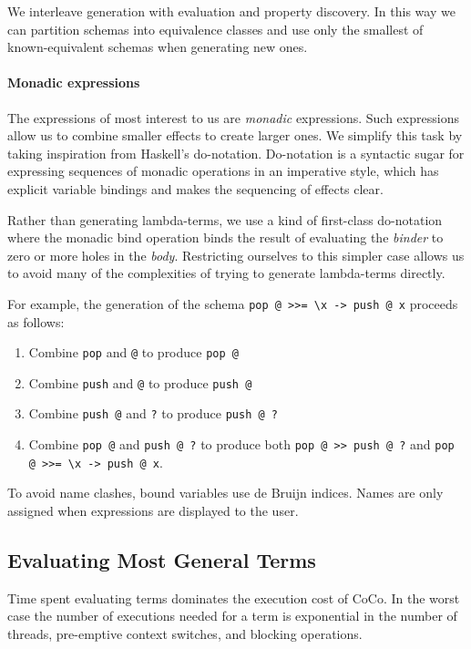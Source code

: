 We interleave generation with evaluation and property discovery.  In
this way we can partition schemas into equivalence classes and use
only the smallest of known-equivalent schemas when generating new
ones.

\paragraph{Monadic expressions}
The expressions of most interest to us are \emph{monadic} expressions.
Such expressions allow us to combine smaller effects to create larger
ones.  We simplify this task by taking inspiration from Haskell's
do-notation.  Do-notation is a syntactic sugar for expressing
sequences of monadic operations in an imperative style, which has
explicit variable bindings and makes the sequencing of effects clear.

Rather than generating lambda-terms, we use a kind of first-class
do-notation where the monadic bind operation binds the result of
evaluating the \emph{binder} to zero or more holes in the \emph{body}.
Restricting ourselves to this simpler case allows us to avoid many of
the complexities of trying to generate lambda-terms directly.

For example, the generation of the schema
\verb|pop @ >>= \x -> push @ x| proceeds as follows:

\begin{enumerate}
\item Combine \verb|pop| and \verb|@| to produce \verb|pop @|
\item Combine \verb|push| and \verb|@| to produce \verb|push @|
\item Combine \verb|push @| and \verb|?| to produce \verb|push @ ?|
\item Combine \verb|pop @| and \verb|push @ ?| to produce both
  \verb|pop @ >> push @ ?| and \verb|pop @ >>= \x -> push @ x|.
\end{enumerate}

To avoid name clashes, bound variables use de Bruijn
indices\cite{debruijn1972}.  Names are only assigned when expressions
are displayed to the user.

\subsection{Evaluating Most General Terms}
\label{sec:coco-hiw-eval}

Time spent evaluating terms dominates the execution cost of CoCo.  In
the worst case the number of executions needed for a term is
exponential in the number of threads, pre-emptive context switches,
and blocking operations\cite{musuvathi2007}.

